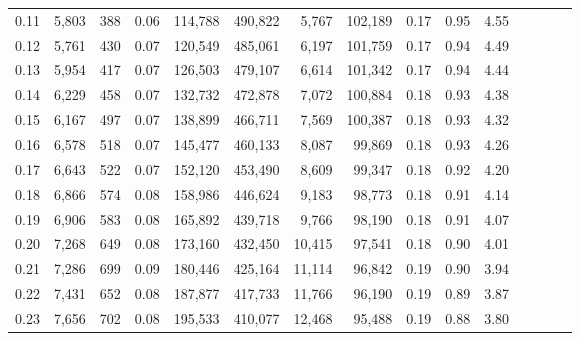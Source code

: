 \begin{tabular}{rrrcrrrrrrrrrrr}
0.11 &   5,803 &     388 &                                       0.06 &  114,788 &  490,822 &    5,767 &  102,189 &  0.17 &  0.95 &                         4.55 \\
0.12 &   5,761 &     430 &                                       0.07 &  120,549 &  485,061 &    6,197 &  101,759 &  0.17 &  0.94 &                         4.49 \\
0.13 &   5,954 &     417 &                                       0.07 &  126,503 &  479,107 &    6,614 &  101,342 &  0.17 &  0.94 &                         4.44 \\
0.14 &   6,229 &     458 &                                       0.07 &  132,732 &  472,878 &    7,072 &  100,884 &  0.18 &  0.93 &                         4.38 \\
0.15 &   6,167 &     497 &                                       0.07 &  138,899 &  466,711 &    7,569 &  100,387 &  0.18 &  0.93 &                         4.32 \\
0.16 &   6,578 &     518 &                                       0.07 &  145,477 &  460,133 &    8,087 &   99,869 &  0.18 &  0.93 &                         4.26 \\
0.17 &   6,643 &     522 &                                       0.07 &  152,120 &  453,490 &    8,609 &   99,347 &  0.18 &  0.92 &                         4.20 \\
0.18 &   6,866 &     574 &                                       0.08 &  158,986 &  446,624 &    9,183 &   98,773 &  0.18 &  0.91 &                         4.14 \\
0.19 &   6,906 &     583 &                                       0.08 &  165,892 &  439,718 &    9,766 &   98,190 &  0.18 &  0.91 &                         4.07 \\
0.20 &   7,268 &     649 &                                       0.08 &  173,160 &  432,450 &   10,415 &   97,541 &  0.18 &  0.90 &                         4.01 \\
0.21 &   7,286 &     699 &                                       0.09 &  180,446 &  425,164 &   11,114 &   96,842 &  0.19 &  0.90 &                         3.94 \\
0.22 &   7,431 &     652 &                                       0.08 &  187,877 &  417,733 &   11,766 &   96,190 &  0.19 &  0.89 &                         3.87 \\
0.23 &   7,656 &     702 &                                       0.08 &  195,533 &  410,077 &   12,468 &   95,488 &  0.19 &  0.88 &                         3.80 \\

\end{tabular}
